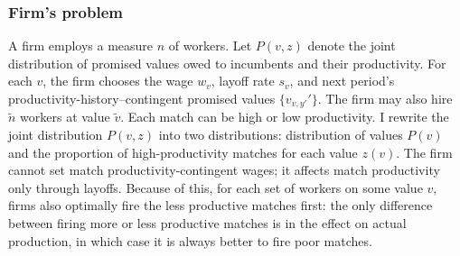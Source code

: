 \subsubsection*{Firm’s problem}
A firm employs a measure $n$ of workers. Let $P(v,z)$ denote the joint distribution of promised values owed to incumbents and their productivity. For each $v$, the firm chooses the wage $w_v$, layoff rate $s_v$, and next period’s productivity-history–contingent promised values $\{v_{v,y'}'\}$. The firm may also hire $\tilde{n}$ workers at value $\tilde{v}$. Each match can be high or low productivity. I rewrite the joint distribution $P(v,z)$ into two distributions: distribution of values $P(v)$ and the proportion of high-productivity matches for each value $z(v)$. The firm cannot set match productivity-contingent wages; it affects match productivity only through layoffs.%
Because of this, for each set of workers on some value $v$, firms also optimally fire the less productive matches first: the only difference between firing more or less productive matches is in the effect on actual production, in which case it is always better to fire poor matches.

